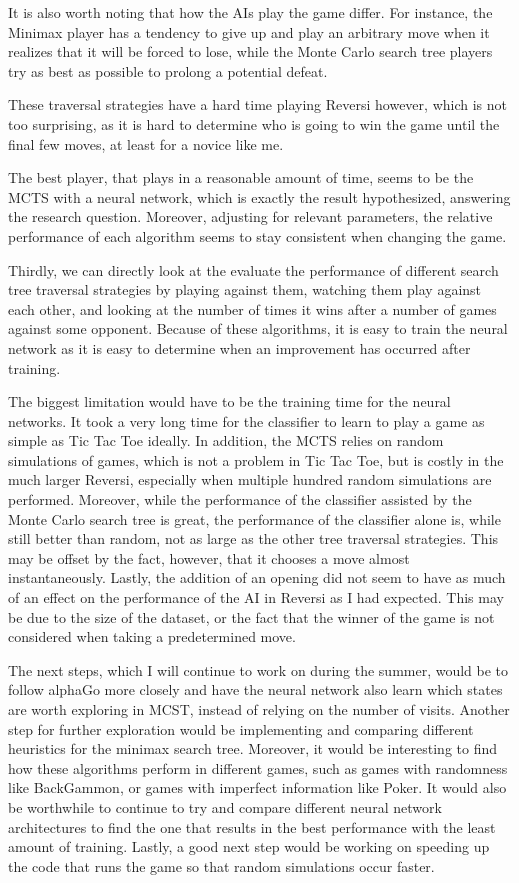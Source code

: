 \documentclass[fontsize=11pt]{article}
\begin{document}
It is also worth noting that how the AIs play the game differ. For instance, the Minimax player has 
a tendency to give up and play an arbitrary move when it realizes that it will be forced to lose,
while the Monte Carlo search tree players try as best as possible to prolong a potential defeat.

These traversal strategies have a hard time playing Reversi however, which is not too surprising, 
as it is hard to determine who is going to win the game until the final few moves, at least 
for a novice like me.

The best player, that plays in a reasonable amount of time, seems to be the MCTS with a neural network, 
which is exactly the result hypothesized, answering the research question. Moreover, adjusting for relevant parameters, the relative performance 
of each algorithm seems to stay consistent when changing the game.

Thirdly, we can directly look at the evaluate the performance of different search tree 
traversal strategies by playing against them, watching them play against each other, and 
looking at the number of times it wins after a number of games against some opponent.
Because of these algorithms, it is easy to train the neural network as it is easy to determine when 
an improvement has occurred after training.

The biggest limitation would have to be the training time for the neural networks.
It took a very long time for the classifier to learn to play a game as 
simple as Tic Tac Toe ideally. In addition, the MCTS relies on random simulations 
of games, which is not a problem in Tic Tac Toe, but is costly in the much larger Reversi, 
especially when multiple hundred random simulations are performed.
Moreover, while the performance 
of the classifier assisted by the Monte Carlo search tree is great, 
the performance of the classifier alone is, while still better than 
random, not as large as the other tree traversal strategies.
This may be offset by the fact, however, that it chooses a move 
almost instantaneously. Lastly, the addition of an opening did not seem to 
have as much of an effect on the performance of the AI in Reversi as I had expected.
This may be due to the size of the dataset, or the fact that 
the winner of the game is not considered when taking a predetermined move.

The next steps, which I will continue to work on during the summer, 
would be to follow alphaGo more closely and have the neural network
also learn which states are worth exploring in MCST, instead of relying on 
the number of visits. Another step for further exploration 
would be implementing and comparing different heuristics for the minimax 
search tree. Moreover, it would be interesting to find how these 
algorithms perform in different games, 
such as games with randomness like BackGammon, or games with imperfect 
information like Poker. It would also be worthwhile to continue to try and compare 
different neural network architectures to find the one that results in the 
best performance with the least amount of training. Lastly, a good next 
step would be working on speeding up the code that runs the game so that random simulations 
occur faster.
\end{document}
